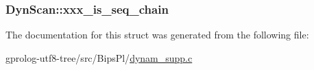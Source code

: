 \subsubsection[{\texorpdfstring{xxx\+\_\+is\+\_\+seq\+\_\+chain}{xxx_is_seq_chain}}]{ Dyn\+Scan\+::xxx\+\_\+is\+\_\+seq\+\_\+chain}\hypertarget{structDynScan_acd70059e162c998780954a78427ad3ee}{}\label{structDynScan_acd70059e162c998780954a78427ad3ee}


The documentation for this struct was generated from the following file\+:\begin{DoxyCompactItemize}
\item 
gprolog-\/utf8-\/tree/src/\+Bips\+Pl/\hyperlink{dynam__supp_8c}{dynam\+\_\+supp.\+c}\end{DoxyCompactItemize}
